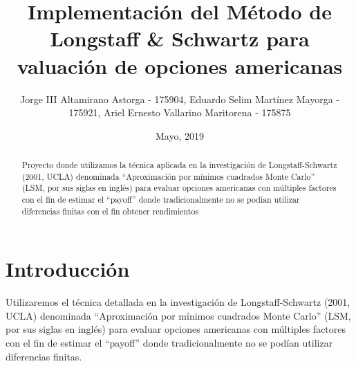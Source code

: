 \documentclass[12pt,reqno,letter]{article}
\begin{document}
	\title{ Implementación del Método de Longstaff \& Schwartz para valuación de opciones americanas }
	\author{Jorge III Altamirano Astorga - 175904, Eduardo Selim Martínez Mayorga - 175921, Ariel Ernesto Vallarino Maritorena - 175875}
	\date{Mayo, 2019}
	\maketitle
	
	\begin{abstract}
		Proyecto donde utilizamos la técnica aplicada en la investigación de Longstaff-Schwartz (2001, UCLA) denominada  “Aproximación por mínimos cuadrados Monte Carlo” (LSM, por sus siglas en inglés) para evaluar opciones americanas con múltiples factores con el fin de estimar el “payoff” donde tradicionalmente no se podían utilizar diferencias finitas con el fin obtener rendimientos
	\end{abstract}

	\tableofcontents

	

	\section{Introducción}
	Utilizaremos el técnica detallada en la investigación de Longstaff-Schwartz (2001, UCLA) denominada  “Aproximación por mínimos cuadrados Monte Carlo” (LSM, por sus siglas en inglés) para evaluar opciones americanas con múltiples factores con el fin de estimar el “payoff” donde tradicionalmente no se podían utilizar diferencias finitas.
	
\end{document}
